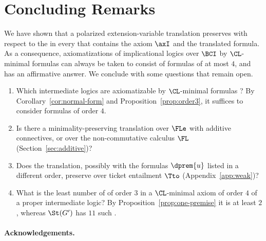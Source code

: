 \section{Concluding Remarks}\label{sec:conclusion}

We have shown that a polarized extension-variable translation
preserves  with respect
to the  in every  that contains the axiom $\axI$
and the translated formula. As a consequence, axiomatizations of
implicational logics over $\BCI$ by $\CL$-minimal formulas can
always be taken to consist of formulas of  at most $4$, and
\cite[Open Problem~2]{NM21} has an affirmative answer. We conclude with
some questions that remain open.
\begin{enumerate}
\item Which intermediate logics are axiomatizable by $\CL$-minimal formulas
  \cite[Open Problem~1]{NM21}? By Corollary~\ref{cor:normal-form} and
  Proposition~\ref{prop:order3}, it suffices to consider formulas of order $4$.
\item Is there a minimality-preserving translation over $\FLe$
  with additive connectives, or over the non-commutative calculus
  $\FL$ (Section~\ref{sec:additive})?
\item Does the translation, possibly with the formulas $\dprem{u}$ listed in a different order, preserve
   over ticket entailment $\Tto$
  (Appendix~\ref{app:weak})?
\item What is the least number of  of order $3$ in a
  $\CL$-minimal axiom of order $4$ of a proper intermediate logic? By
  Proposition~\ref{prop:one-premise} it is at least $2$, whereas $\St(G')$
  has $11$ such .
\end{enumerate}

\paragraph{Acknowledgements.} 
